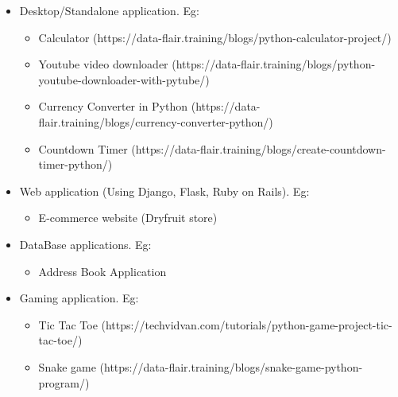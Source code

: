 \begin{flushleft}	
	\bigskip
		
		\begin{itemize}
			\item Desktop/Standalone application. Eg:
			\begin{itemize}
				\item Calculator (https://data-flair.training/blogs/python-calculator-project/)
				\item Youtube video downloader (https://data-flair.training/blogs/python-youtube-downloader-with-pytube/)
				\item Currency Converter in Python (https://data-flair.training/blogs/currency-converter-python/)
				\item  Countdown Timer (https://data-flair.training/blogs/create-countdown-timer-python/)
			\end{itemize}
			
			\item Web application (Using Django, Flask, Ruby on Rails). Eg:
			\begin{itemize}
				\item E-commerce website (Dryfruit store)
			\end{itemize}
		
			\item DataBase applications. Eg:
			\begin{itemize}
				\item Address Book Application
			\end{itemize}
		
			\item Gaming application. Eg:
			\begin{itemize}
				\item Tic Tac Toe (https://techvidvan.com/tutorials/python-game-project-tic-tac-toe/)
				\item Snake game (https://data-flair.training/blogs/snake-game-python-program/)
			\end{itemize}
		

\end{itemize}
\end{flushleft}
